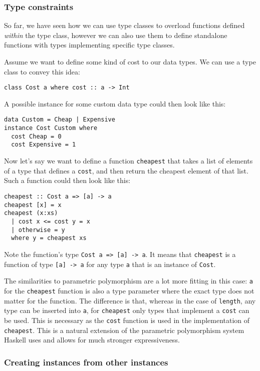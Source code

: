 \subsubsection{Type constraints}\label{constraints}

So far, we have seen how we can use type classes to overload functions defined \textit{within} the type class, however we can also use them to define standalone functions with types implementing specific type classes.

Assume we want to define some kind of cost to our data types. We can use a type class to convey this idea:
\begin{verbatim}
class Cost a where cost :: a -> Int
\end{verbatim}
A possible instance for some custom data type could then look like this:
\begin{verbatim}
data Custom = Cheap | Expensive
instance Cost Custom where
  cost Cheap = 0
  cost Expensive = 1
\end{verbatim}
Now let's say we want to define a function \verb|cheapest| that takes a list of elements of a type that defines a \verb|cost|, and then return the cheapest element of that list. Such a function could then look like this:
\begin{verbatim}
cheapest :: Cost a => [a] -> a
cheapest [x] = x
cheapest (x:xs)
  | cost x <= cost y = x
  | otherwise = y
  where y = cheapest xs
\end{verbatim}
Note the function's type \verb|Cost a => [a] -> a|. It means that \verb|cheapest| is a function of type \verb|[a] -> a| for any type \verb|a| that is an instance of \verb|Cost|.

The similarities to parametric polymorphism are a lot more fitting in this case: \verb|a| for the \verb|cheapest| function is also a type parameter where the exact type does not matter for the function. The difference is that, whereas in the case of \verb|length|, any type can be inserted into \verb|a|, for \verb|cheapest| only types that implement a \verb|cost| can be used. This is necessary as the \verb|cost| function is used in the implementation of \verb|cheapest|. This is a natural extension of the parametric polymorphism system Haskell uses and allows for much stronger expressiveness.

\subsubsection{Creating instances from other instances}

